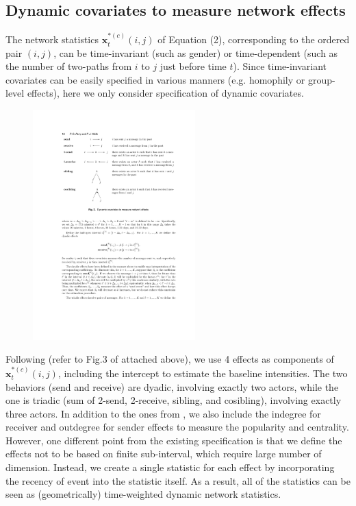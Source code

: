 \documentclass[a4paper]{article}
\begin{document}
 \subsection{Dynamic covariates to measure network effects} \label{subsec: Dynamic covariates}
 The network statistics $\boldsymbol{x}^{*(c)}_t(i, j)$ of Equation (2), corresponding to the ordered pair $(i, j)$, can be time-invariant (such as gender) or time-dependent (such as the number of two-paths from $i$ to $j$ just before time $t$). Since time-invariant covariates can be easily specified in various manners (e.g. homophily or group-level effects), here we only consider specification of dynamic covariates.\\
 \begin{figure}[ht]
 	\centering
 	\includegraphics[width=0.56\textwidth]{PerryWolfe.pdf} 
 	\label{fig:PerryWolfeplot}
 \end{figure}
 \newline Following \cite{PerryWolfe2012} (refer to Fig.3 of \cite{PerryWolfe2012} attached above), we use 4 effects as components of $\boldsymbol{x}^{*(c)}_t(i, j)$, including the intercept to estimate the baseline intensities. The two behaviors (send and receive) are dyadic, involving exactly two actors,
 while the one is triadic (sum of 2-send, 2-receive, sibling, and cosibling), involving exactly three actors. In addition to the ones from \cite{PerryWolfe2012}, we also include the indegree for receiver and outdegree for sender effects to measure the popularity and centrality. However, one different point from the existing specification is that we define the effects not to be based on finite sub-interval, which require large number of dimension. Instead, we create a single statistic for each effect by incorporating the recency of event into the statistic itself. As a result, all of the statistics can be seen as (geometrically) time-weighted dynamic network statistics.
\end{document}
